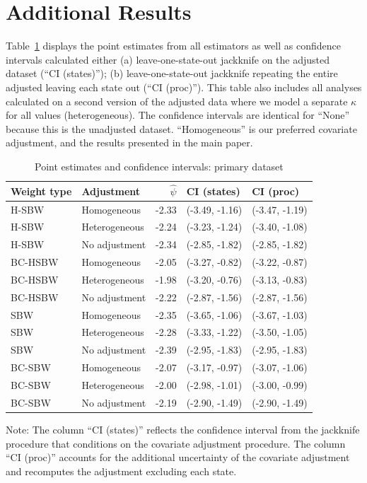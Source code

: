 \section{Additional Results}
\label{ssec:allresults}

Table~\ref{tab:confintmain} displays the point estimates from all estimators as well as confidence intervals calculated either (a) leave-one-state-out jackknife on the adjusted dataset (``CI (states)''); (b) leave-one-state-out jackknife repeating the entire adjusted leaving each state out (``CI (proc)''). This table also includes all analyses calculated on a second version of the adjusted data where we model a separate $\kappa$ for all values (heterogeneous). The confidence intervals are identical for ``None'' because this is the unadjusted dataset. ``Homogeneous'' is our preferred covariate adjustment, and the results presented in the main paper.

\begin{table}[h!]
\centering
\begin{threeparttable}
\caption{Point estimates and confidence intervals: primary dataset}
\label{tab:confintmain}
\begin{tabular}{llrll}
  \hline
Weight type & Adjustment & $\hat{\psi}$ & CI (states) & CI (proc) \\ 
  \hline
H-SBW & Homogeneous & -2.33 & (-3.49, -1.16) & (-3.47, -1.19) \\ 
  H-SBW & Heterogeneous & -2.24 & (-3.23, -1.24) & (-3.40, -1.08) \\ 
  H-SBW & No adjustment & -2.34 & (-2.85, -1.82) & (-2.85, -1.82) \\ 
  BC-HSBW & Homogeneous & -2.05 & (-3.27, -0.82) & (-3.22, -0.87) \\ 
  BC-HSBW & Heterogeneous & -1.98 & (-3.20, -0.76) & (-3.13, -0.83) \\ 
  BC-HSBW & No adjustment & -2.22 & (-2.87, -1.56) & (-2.87, -1.56) \\ 
  SBW & Homogeneous & -2.35 & (-3.65, -1.06) & (-3.67, -1.03) \\ 
  SBW & Heterogeneous & -2.28 & (-3.33, -1.22) & (-3.50, -1.05) \\ 
  SBW & No adjustment & -2.39 & (-2.95, -1.83) & (-2.95, -1.83) \\ 
  BC-SBW & Homogeneous & -2.07 & (-3.17, -0.97) & (-3.07, -1.06) \\ 
  BC-SBW & Heterogeneous & -2.00 & (-2.98, -1.01) & (-3.00, -0.99) \\ 
  BC-SBW & No adjustment & -2.19 & (-2.90, -1.49) & (-2.90, -1.49) \\ 
   \hline
\end{tabular}
    \begin{tablenotes}
      \item[] Note: The column ``CI (states)'' reflects the confidence interval from the jackknife procedure that conditions on the covariate adjustment procedure. The column ``CI (proc)'' accounts for the additional uncertainty of the covariate adjustment and recomputes the adjustment excluding each state.
    \end{tablenotes}
\end{threeparttable}
\end{table}

